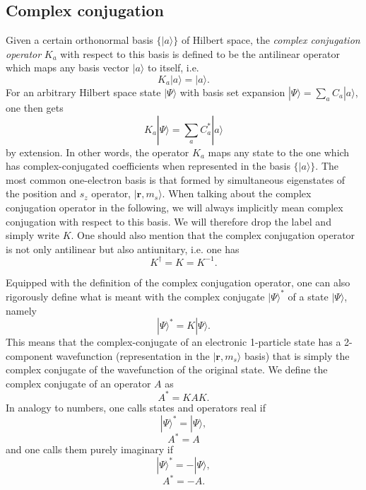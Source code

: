 \subsection{Complex conjugation}
\label{Sec:ComplexConjugation}
Given a certain orthonormal basis $\{|a\rangle\}$ of Hilbert space, the \emph{complex conjugation operator} $K_a$ with respect to this basis is defined to be the antilinear operator which maps any basis vector $|a\rangle$ to itself, i.e.
\begin{equation}
K_a |a\rangle = |a\rangle.
\end{equation}
For an arbitrary Hilbert space state $|\Psi\rangle$ with basis set expansion $|\Psi\rangle = \sum_a C_a |a\rangle$, one then gets
\begin{equation}
K_a |\Psi\rangle = \sum_a C_a^\ast |a\rangle
\end{equation}
by extension.
In other words, the operator $K_a$ maps any state to the one which has complex-conjugated coefficients when represented in the basis $\{|a\rangle\}$.
The most common one-electron basis is that formed by simultaneous eigenstates of the position and $s_z$ operator, $|\mathbf{r}, m_s\rangle$. When talking about the complex conjugation operator in the following, we will always implicitly mean complex conjugation with respect to this basis. We will therefore drop the label and simply write $K$.
One should also mention that the complex conjugation operator is not only antilinear but also antiunitary, i.e. one has
\begin{equation}
K^\dagger = K = K^{-1}.
\end{equation}

Equipped with the definition of the complex conjugation operator, one can also rigorously define what is meant with the complex conjugate $|\Psi\rangle^\ast$ of a state $|\Psi\rangle$, namely
\begin{equation}
|\Psi\rangle^\ast = K |\Psi\rangle.
\end{equation}
This means that the complex-conjugate of an electronic 1-particle state has a 2-com\-po\-nent wavefunction (representation in the $|\mathbf{r}, m_s\rangle$ basis) that is simply the complex conjugate of the wavefunction of the original state. We define the complex conjugate of an operator $A$ as
\begin{equation}
A^\ast = K A K.
\end{equation}
In analogy to numbers, one calls states and operators real if
\begin{equation}
|\Psi\rangle^\ast = |\Psi\rangle,
\end{equation}
\begin{equation}
A^\ast = A
\end{equation} 
and one calls them purely imaginary if
\begin{equation}
|\Psi\rangle^\ast = -|\Psi\rangle,
\end{equation}
\begin{equation}
A^\ast = -A.
\end{equation}

